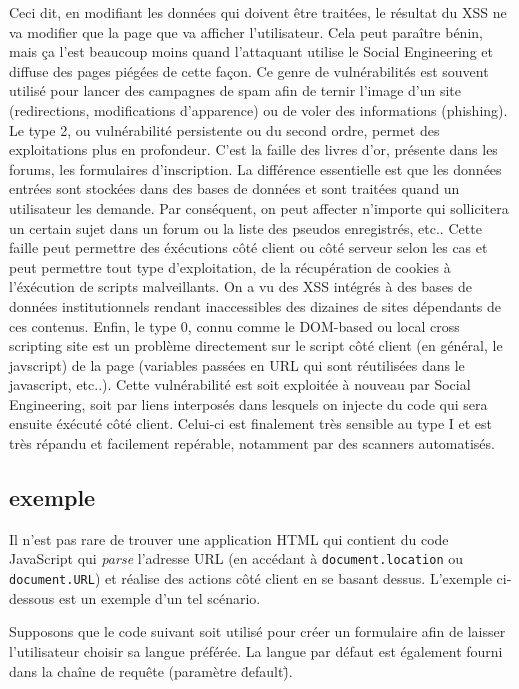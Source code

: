 \documentclass[a4paper,12pt]{report}
\begin{document}
  Ceci dit, en modifiant les données qui doivent être traitées, le résultat du XSS ne va modifier que la page que va afficher l'utilisateur. Cela peut paraître bénin, mais ça l'est beaucoup moins quand l'attaquant utilise le Social Engineering et diffuse des pages piégées de cette façon. Ce genre de vulnérabilités est souvent utilisé pour lancer des campagnes de spam afin de ternir l'image d'un site (redirections, modifications d'apparence) ou de voler des informations (phishing).
  Le type 2, ou vulnérabilité persistente ou du second ordre, permet des exploitations plus en profondeur. C'est la faille des livres d'or, présente dans les forums, les formulaires d'inscription. La différence essentielle est que les données entrées sont stockées dans des bases de données et sont traitées quand un utilisateur les demande. Par conséquent, on peut affecter n'importe qui sollicitera un certain sujet dans un forum ou la liste des pseudos enregistrés, etc.. Cette faille peut permettre des éxécutions côté client ou côté serveur selon les cas et peut permettre tout type d'exploitation, de la récupération de cookies à l'éxécution de scripts malveillants. On a vu des XSS intégrés à des bases de données institutionnels rendant inaccessibles des dizaines de sites dépendants de ces contenus.
  Enfin, le type 0, connu comme le DOM-based ou local cross scripting site est un problème directement sur le script côté client (en général, le javscript) de la page (variables passées en URL qui sont réutilisées dans le javascript, etc..). Cette vulnérabilité est soit exploitée à nouveau par Social Engineering, soit par liens interposés dans lesquels on injecte du code qui sera ensuite éxécuté côté client. Celui-ci est finalement très sensible au type I et est très répandu et facilement repérable, notamment par des scanners automatisés.

  \subsection{exemple} %
  \label{sub:exemple}
  Il n'est pas rare de trouver une application HTML qui contient du code JavaScript qui \textit{parse} l'adresse URL (en accédant à \lstinline{document.location} ou \lstinline{document.URL}) et réalise des actions côté client en se basant dessus. L'exemple ci-dessous est un exemple d'un tel scénario.

  Supposons que le code suivant soit utilisé pour créer un formulaire afin de laisser l'utilisateur choisir sa langue préférée. La langue par défaut est également fourni dans la chaîne de requête (paramètre \"default\").
\end{document}

